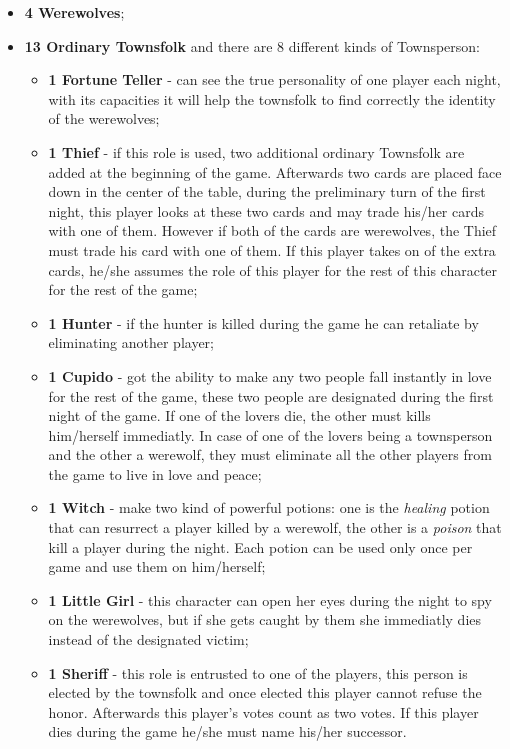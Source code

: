 \documentclass{article}
\begin{document}
\begin{itemize}
	\item \textbf{4 Werewolves}; 	
	\item \textbf{13 Ordinary Townsfolk} and there are 8 different kinds of Townsperson: 
	\begin{itemize}
		\item \textbf{1 Fortune Teller} - can see the true personality of one player each night, with its capacities it will help the townsfolk to find  correctly the identity of the werewolves;
		\item \textbf{1 Thief} - if this role is used, two additional ordinary Townsfolk are added at the beginning of the game. Afterwards two cards are placed face down in the center of the table, during the preliminary turn of the first night, this player looks at these two cards and may trade his/her cards with one of them. However if both of the cards are werewolves, the Thief must trade his card with one of them. If this player takes on of the extra cards, he/she assumes the role of this player for the rest of this character for the rest of the game;
		\item \textbf{1 Hunter} - if the hunter is killed during the game he can retaliate by eliminating another player;
		\item \textbf{1 Cupido} - got the ability to make any two people fall instantly in love for the rest of the game, these two people are designated during the first night of the game. If one of the lovers die, the other must kills him/herself immediatly. In case of one of the lovers being a townsperson and the other a werewolf, they must eliminate all the other players from the game to live in love and peace;
		\item \textbf{1 Witch} - make two kind of powerful potions: one is the \textit{healing} potion that can resurrect a player killed by a werewolf, the other is a \textit{poison} that kill a player during the night. Each potion can be used only once per game and use them on him/herself;
		\item \textbf{1 Little Girl} - this character can open her eyes during the night to spy on the werewolves, but if she gets caught by them she immediatly dies instead of the designated victim;
		\item \textbf{1 Sheriff} - this role is entrusted to one of the players, this person is elected by the townsfolk and once elected this player cannot refuse the honor. Afterwards this player's votes count as two votes. If this player dies during the game he/she must name his/her successor.
	\end{itemize}
\end{itemize}
\end{document}
